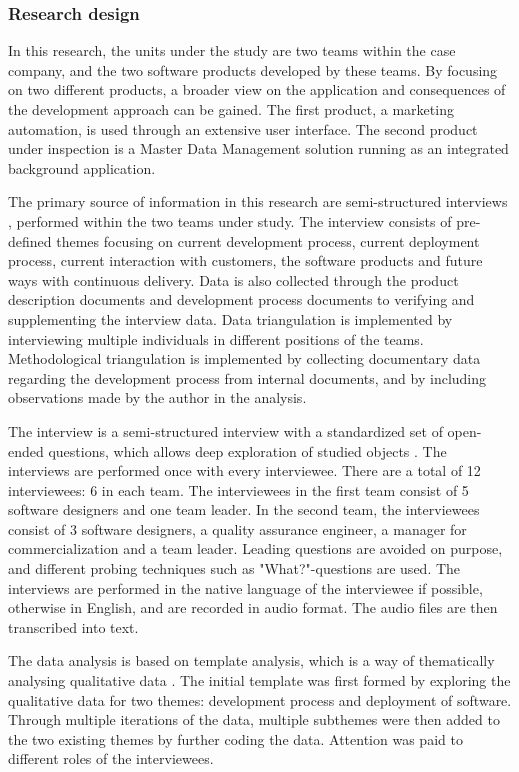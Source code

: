 \documentclass[lnbip]{svmultln}
\begin{document}
\subsubsection{Research design}
In this research, the units under the study are two teams within the case company, and the two software products developed by these teams. By focusing on two different products, a broader view on the application and consequences of the development approach can be gained. The first product, a marketing automation, is used through an extensive user interface. The second product under inspection is a Master Data Management \cite{loshin2010master} solution running as an integrated background application. 

The primary source of information in this research are semi-structured interviews \cite{runeson2009guidelines}, performed within the two teams under study. The interview consists of pre-defined themes focusing on current development process, current deployment process, current interaction with customers, the software products and future ways with continuous delivery. Data is also collected through the product description documents and development process documents to verifying and supplementing the interview data. Data triangulation is implemented by interviewing multiple individuals in different positions of the teams. Methodological triangulation is implemented by collecting documentary data regarding the development process from internal documents, and by including observations made by the author in the analysis. 

The interview is a semi-structured interview with a standardized set of open-ended questions, which allows deep exploration of studied objects \cite{runeson2009guidelines}. The interviews are performed once with every interviewee. There are a total of 12 interviewees: 6 in each team. The interviewees in the first team consist of 5 software designers and one team leader. In the second team, the interviewees consist of 3 software designers, a quality assurance engineer, a manager for commercialization and a team leader. Leading questions are avoided on purpose, and different probing techniques such as "What?"-questions are used. The interviews are performed in the native language of the interviewee if possible, otherwise in English, and are recorded in audio format. The audio files are then transcribed into text.

The data analysis is based on template analysis, which is a way of thematically analysing qualitative data \cite{king1998template}. The initial template was first formed by exploring the qualitative data for two themes: development process and deployment of software. Through multiple iterations of the data, multiple subthemes were then added to the two existing themes by further coding the data. Attention was paid to different roles of the interviewees.
\end{document}

